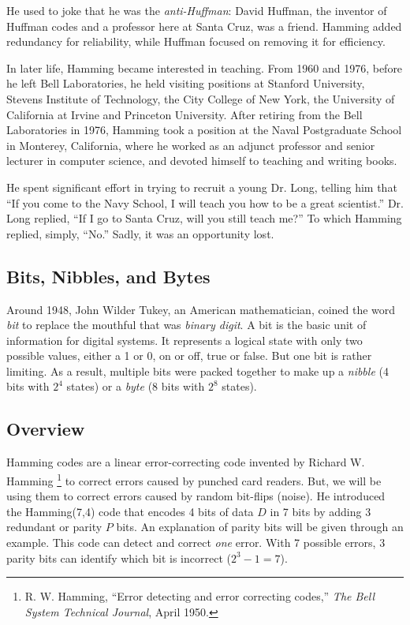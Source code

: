\documentclass[11pt]{article}
\begin{document}
He used to joke that he was the \emph{anti-Huffman}: David Huffman, the
inventor of Huffman codes and a professor here at Santa Cruz, was a
friend. Hamming added redundancy for reliability, while Huffman focused
on removing it for efficiency.

In later life, Hamming became interested in teaching. From 1960 and
1976, before he left Bell Laboratories, he held visiting positions at
Stanford University, Stevens Institute of Technology, the City College
of New York, the University of California at Irvine and Princeton
University. After retiring from the Bell Laboratories in 1976, Hamming
took a position at the Naval Postgraduate School in Monterey,
California, where he worked as an adjunct professor and senior lecturer
in computer science, and devoted himself to teaching and writing books.

He spent significant effort in trying to recruit a young Dr.\xspace
Long, telling him that ``If you come to the Navy School, I will teach
you how to be a great scientist.'' Dr.\xspace Long replied, ``If I go to
Santa Cruz, will you still teach me?'' To which Hamming replied, simply,
``No.'' Sadly, it was an opportunity lost.

\subsection{Bits, Nibbles, and Bytes}

Around 1948, John Wilder Tukey, an American mathematician, coined the
word \emph{bit} to replace the mouthful that was \emph{binary digit}. A
bit is the basic unit of information for digital systems. It represents
a logical state with only two possible values, either a 1 or 0, on or
off, true or false. But one bit is rather limiting. As a result,
multiple bits were packed together to make up a \emph{nibble} (4 bits
with $2^4$ states) or a \emph{byte} (8 bits with $2^8$ states).

\subsection{Overview}

Hamming codes are a linear error-correcting code invented by Richard W.
Hamming \footnote{R. W. Hamming, ``Error detecting and error correcting
codes,'' \textit{The Bell System Technical Journal}, April 1950.} to
correct errors caused by punched card readers.  But, we will be using
them to correct errors caused by random bit-flips (noise). He introduced
the Hamming(7,4) code that encodes 4 bits of data $D$ in 7 bits by
adding 3 redundant or parity $P$ bits. An explanation of parity bits
will be given through an example. This code can detect and correct
\emph{one} error. With 7 possible errors, 3 parity bits can identify
which bit is incorrect ($2^3 - 1 = 7$).
\end{document}
